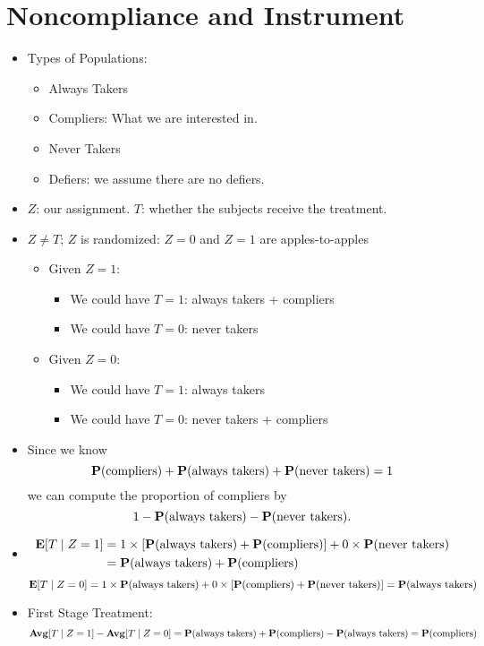 \documentclass[10pt, letterpaper]{article}
\def\E{\vb{E}}
\def\P{\vb{P}}
\def\Avg{\vb{Avg}}
\begin{document}
\section{Noncompliance and Instrument}
\begin{itemize}
	\item Types of Populations:
	\begin{itemize}
		\item Always Takers
		\item Compliers: What we are interested in. 
		\item Never Takers
		\item Defiers: we assume there are no defiers.
	\end{itemize}
	\item $Z$: our assignment. $T$: whether the subjects receive the treatment.
	\item $Z\neq T$; $Z$ is randomized: $Z=0$ and $Z=1$ are apples-to-apples
	\begin{itemize}
		\item Given $Z=1$: 
		\begin{itemize}
			\item We could have $T=1$: always takers + compliers
			\item We could have $T=0$: never takers
		\end{itemize}
		\item Given $Z=0$: 
		\begin{itemize}
			\item We could have $T=1$: always takers
			\item We could have $T=0$: never takers + compliers
		\end{itemize}
	\end{itemize}
	\item Since we know \[\P(\text{compliers}) + \P(\text{always takers}) + \P(\text{never takers}) = 1\] we can compute the proportion of compliers by \[1-\P(\text{always takers}) - \P(\text{never takers}).\]
	\item \begin{align*}\E[T\mid Z=1]&=1\times[\P(\text{always takers})+\P(\text{compliers})]+0\times\P(\text{never takers})\\&=\P(\text{always takers})+\P(\text{compliers})\end{align*}
	\[\E[T\mid Z=0]=1\times\P(\text{always takers})+0\times[\P(\text{compliers})+\P(\text{never takers})]=\P(\text{always takers})\]
	\item First Stage Treatment: \[\Avg[T\mid Z=1]-\Avg[T\mid Z=0]=\P(\text{always takers})+\P(\text{compliers})-\P(\text{always takers})=\P(\text{compliers})\]

\end{itemize}
\end{document}
